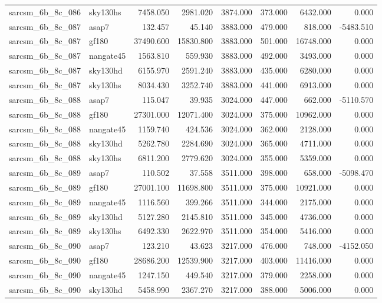 \begin{tabular}{llrrrrrr}
sarcsm\_6b\_8c\_086 & sky130hs & 7458.050 & 2981.020 & 3874.000 & 373.000 & 6432.000 & 0.000 \\
sarcsm\_6b\_8c\_087 & asap7 & 132.457 & 45.140 & 3883.000 & 479.000 & 818.000 & -5483.510 \\
sarcsm\_6b\_8c\_087 & gf180 & 37490.600 & 15830.800 & 3883.000 & 501.000 & 16748.000 & 0.000 \\
sarcsm\_6b\_8c\_087 & nangate45 & 1563.810 & 559.930 & 3883.000 & 492.000 & 3493.000 & 0.000 \\
sarcsm\_6b\_8c\_087 & sky130hd & 6155.970 & 2591.240 & 3883.000 & 435.000 & 6280.000 & 0.000 \\
sarcsm\_6b\_8c\_087 & sky130hs & 8034.430 & 3252.740 & 3883.000 & 441.000 & 6913.000 & 0.000 \\
sarcsm\_6b\_8c\_088 & asap7 & 115.047 & 39.935 & 3024.000 & 447.000 & 662.000 & -5110.570 \\
sarcsm\_6b\_8c\_088 & gf180 & 27301.000 & 12071.400 & 3024.000 & 375.000 & 10962.000 & 0.000 \\
sarcsm\_6b\_8c\_088 & nangate45 & 1159.740 & 424.536 & 3024.000 & 362.000 & 2128.000 & 0.000 \\
sarcsm\_6b\_8c\_088 & sky130hd & 5262.780 & 2284.690 & 3024.000 & 365.000 & 4711.000 & 0.000 \\
sarcsm\_6b\_8c\_088 & sky130hs & 6811.200 & 2779.620 & 3024.000 & 355.000 & 5359.000 & 0.000 \\
sarcsm\_6b\_8c\_089 & asap7 & 110.502 & 37.558 & 3511.000 & 398.000 & 658.000 & -5098.470 \\
sarcsm\_6b\_8c\_089 & gf180 & 27001.100 & 11698.800 & 3511.000 & 375.000 & 10921.000 & 0.000 \\
sarcsm\_6b\_8c\_089 & nangate45 & 1116.560 & 399.266 & 3511.000 & 344.000 & 2175.000 & 0.000 \\
sarcsm\_6b\_8c\_089 & sky130hd & 5127.280 & 2145.810 & 3511.000 & 345.000 & 4736.000 & 0.000 \\
sarcsm\_6b\_8c\_089 & sky130hs & 6492.330 & 2622.970 & 3511.000 & 354.000 & 5416.000 & 0.000 \\
sarcsm\_6b\_8c\_090 & asap7 & 123.210 & 43.623 & 3217.000 & 476.000 & 748.000 & -4152.050 \\
sarcsm\_6b\_8c\_090 & gf180 & 28686.200 & 12539.900 & 3217.000 & 403.000 & 11416.000 & 0.000 \\
sarcsm\_6b\_8c\_090 & nangate45 & 1247.150 & 449.540 & 3217.000 & 379.000 & 2258.000 & 0.000 \\
sarcsm\_6b\_8c\_090 & sky130hd & 5458.990 & 2367.270 & 3217.000 & 388.000 & 5006.000 & 0.000 \\

\end{tabular}

